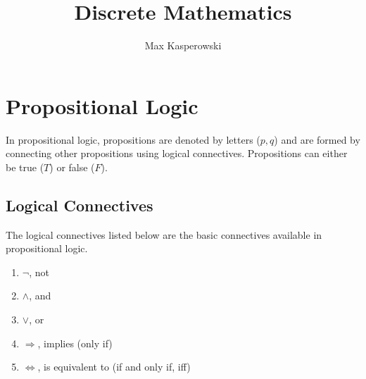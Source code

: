 \documentclass[a4paper, 10pt]{article}
\title{Discrete Mathematics}
\author{Max Kasperowski}
\begin{document}
\maketitle
\tableofcontents

\newpage
\section{Propositional Logic}
In propositional logic, propositions are denoted by letters (\(p, q\)) and are formed by connecting other propositions using logical connectives. Propositions can either be true (\(T\)) or false (\(F\)).
\subsection{Logical Connectives}
The logical connectives listed below are the basic connectives available in propositional logic.
\begin{enumerate}
    \item \( \neg \), not
    \item \( \land \), and
    \item \( \lor \), or
    \item \( \Rightarrow \), implies (only if)
    \item \( \Leftrightarrow \), is equivalent to (if and only if, iff)
\end{enumerate}
\end{document}
